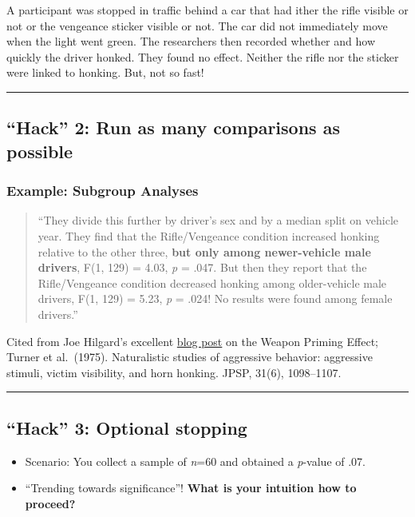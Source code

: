 \documentclass[
  english,
  letterpaper,
  DIV=11,
  numbers=noendperiod]{scrartcl}
\providecommand{\tightlist}{%
  \setlength{\itemsep}{0pt}\setlength{\parskip}{0pt}}
\begin{document}
A participant was stopped in traffic behind a car that had ither the
rifle visible or not or the vengeance sticker visible or not. The car
did not immediately move when the light went green. The researchers then
recorded whether and how quickly the driver honked. They found no
effect. Neither the rifle nor the sticker were linked to honking. But,
not so fast!

\begin{center}\rule{0.5\linewidth}{0.5pt}\end{center}

\subsection{``Hack'' 2: Run as many comparisons as
possible}\label{hack-2-run-as-many-comparisons-as-possible-2}

\subsubsection{Example: Subgroup
Analyses}\label{example-subgroup-analyses-1}

\begin{quote}
``They divide this further by driver's sex and by a median split on
vehicle year. They find that the Rifle/Vengeance condition increased
honking relative to the other three, \textbf{but only among
newer-vehicle male drivers}, F(1, 129) = 4.03, {\emph{p} = .047}. But
then they report that the Rifle/Vengeance condition decreased honking
among older-vehicle male drivers, F(1, 129) = 5.23, {\emph{p} = .024}!
No results were found among female drivers.''
\end{quote}

Cited from Joe Hilgard's excellent
\href{http://crystalprisonzone.blogspot.com/2016/03/the-weapons-priming-effect.html}{blog
post} on the Weapon Priming Effect; Turner et al.~(1975). Naturalistic
studies of aggressive behavior: aggressive stimuli, victim visibility,
and horn honking. JPSP, 31(6), 1098--1107.

\begin{center}\rule{0.5\linewidth}{0.5pt}\end{center}

\subsection{``Hack'' 3: Optional
stopping}\label{hack-3-optional-stopping}

\begin{itemize}
\tightlist
\item
  Scenario: You collect a sample of \emph{n}=60 and obtained a
  \emph{p}-value of .07.
\item
  ``Trending towards significance''! \textbf{What is your intuition how
  to proceed?}
\end{itemize}
\end{document}
